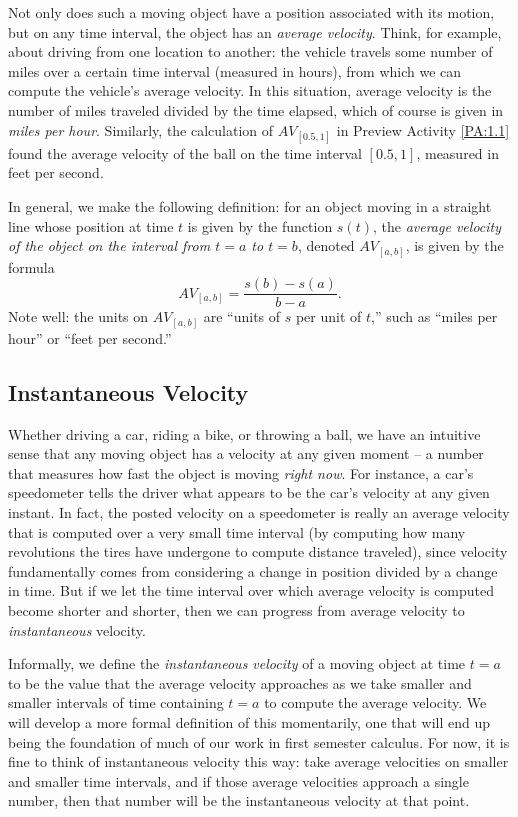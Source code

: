 Not only does such a moving object have a position associated with its motion, but on any time interval, the object has an \emph{average velocity}.   Think, for example, about driving from one location to another:  the vehicle travels some number of miles over a certain time interval (measured in hours), from which we can compute the vehicle's average velocity.  In this situation, average velocity is the number of miles traveled divided by the time elapsed, which of course is given in \emph{miles per hour}. Similarly, the calculation of $AV_{[0.5,1]}$ in Preview Activity \ref{PA:1.1} found the average velocity of the ball on the time interval $[0.5,1]$, measured in feet per second.

In general, we make the following definition:  for an object moving in a straight line whose position at time $t$ is given by the function $s(t)$, the \emph{average velocity of the object on the interval from $t = a$ to $t = b$}, denoted $AV_{[a,b]}$, is given by the formula
$$AV_{[a,b]} = \frac{s(b)-s(a)}{b-a}.$$
Note well: the units on $AV_{[a,b]}$ are 
``units of $s$ per unit of $t$,'' such as ``miles per hour'' or ``feet per second.''





\subsection*{Instantaneous Velocity}

Whether driving a car, riding a bike, or throwing a ball, we have an intuitive sense that any moving object has a velocity at any given moment -- a number that measures how fast the object is moving \emph{right now}.  For instance, a car's speedometer tells the driver what appears to be the car's velocity at any given instant.  In fact, the posted velocity on a speedometer is really an average velocity that is computed over a very small time interval (by computing how many revolutions the tires have undergone to compute distance traveled), since velocity fundamentally comes from considering a change in position divided by a change in time.  But if we let the time interval over which average velocity is computed become shorter and shorter, then we can progress from average velocity to \emph{instantaneous} velocity.  

Informally, we define the \emph{instantaneous velocity} of a moving object at time $t = a$ to be the value that the average velocity approaches as we take smaller and smaller intervals of time containing $t = a$ to compute the average velocity.  We will develop a more formal definition of this momentarily, one that will end up being the foundation of much of our work in first semester calculus.  For now, it is fine to think of instantaneous velocity this way:  take average velocities on smaller and smaller time intervals, and if those average velocities approach a single number, then that number will be the instantaneous velocity at that point.

